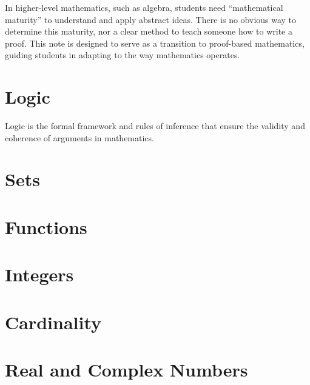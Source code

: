 \documentclass[10pt]{article}
\begin{document}
\def\htitle{An Introduction to Proofs}
\def\hauthor{Hassium,}
\hsetup
\htoc
\hmain
\par
In higher-level mathematics, such as algebra, students need ``mathematical maturity'' to understand and apply abstract ideas. There is no obvious way to determine this maturity, nor a clear method to teach someone how to write a proof. This note is designed to serve as a transition to proof-based mathematics, guiding students in adapting to the way mathematics operates.
\section{Logic}
Logic is the formal framework and rules of inference that ensure the validity and coherence of arguments in mathematics. 



\newpage


\section{Sets}


\section{Functions}


\section{Integers}



\section{Cardinality}



\section{Real and Complex Numbers}

\hindex
\end{document}
